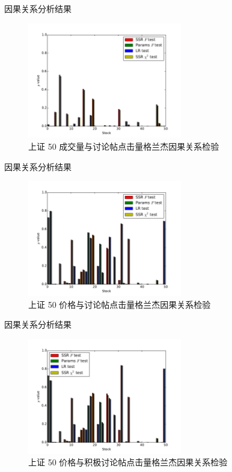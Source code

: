 \documentclass{beamer}
\begin{document}
\begin{frame}{因果关系分析}{结果}
\begin{figure}
  \includegraphics[width=0.6\textwidth]{plots/granger_causality_test_volume_on_sse_50.pdf}
  \caption{上证 50 成交量与讨论帖点击量格兰杰因果关系检验}
\end{figure}
\end{frame}

\begin{frame}{因果关系分析}{结果}
\begin{figure}
  \includegraphics[width=0.6\textwidth]{plots/granger_causality_test_price_on_sse_50.pdf}
  \caption{上证 50 价格与讨论帖点击量格兰杰因果关系检验}
\end{figure}
\end{frame}

\begin{frame}{因果关系分析}{结果}
\begin{figure}
  \includegraphics[width=0.6\textwidth]{plots/granger_causality_test_price_positive_on_sse_50.pdf}
  \caption{上证 50 价格与积极讨论帖点击量格兰杰因果关系检验}
\end{figure}
\end{frame}
\end{document}
